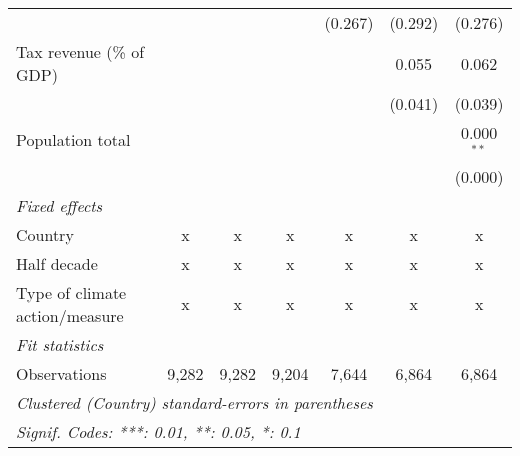 \begin{tabular}{lcccccc}
                                                  &              &              &               & (0.267)      & (0.292)      & (0.276)\\   
   Tax revenue (\% of GDP)                        &              &              &               &              & 0.055        & 0.062\\   
                                                  &              &              &               &              & (0.041)      & (0.039)\\   
   Population total                               &              &              &               &              &              & 0.000$^{**}$\\   
                                                  &              &              &               &              &              & (0.000)\\   
   \emph{Fixed effects}\\
   Country                                        & x            & x            & x             & x            & x            & x\\  
   Half decade                                    & x            & x            & x             & x            & x            & x\\  
   Type of climate action/measure                 & x            & x            & x             & x            & x            & x\\  
   \midrule \emph{Fit statistics}\\
   Observations                                   & 9,282        & 9,282        & 9,204         & 7,644        & 6,864        & 6,864\\  
   \midrule
   \multicolumn{7}{l}{\emph{Clustered (Country) standard-errors in parentheses}}\\
   \multicolumn{7}{l}{\emph{Signif. Codes: ***: 0.01, **: 0.05, *: 0.1}}\\
\end{tabular}
\par\endgroup


